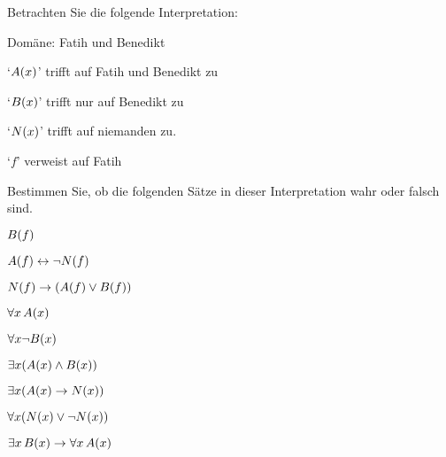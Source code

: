 \practiceproblems
\problempart
\label{pr.TorF1}
Betrachten Sie die folgende Interpretation:
	\begin{ebullet}
		\item Domäne: Fatih und Benedikt
		\item `$\mathord{A}(x)$' trifft auf Fatih und Benedikt zu
		\item `$\mathord{B}(x)$' trifft nur auf Benedikt zu
		\item `$\mathord{N}(x)$' trifft auf niemanden zu.
		\item `$f$' verweist auf Fatih
	\end{ebullet}
Bestimmen Sie, ob die folgenden Sätze in dieser Interpretation wahr oder falsch sind.
\begin{earg}
\item $\mathord{B}(f) $
\item $\mathord{A}(f)  \leftrightarrow \neg \mathord{N}(f)$
\item $\mathord{N}(f)  \rightarrow (\mathord{A}(f) \vee \mathord{B}(f))$
\item $\forall x\, \mathord{A}(x)$
\item $\forall x \neg \mathord{B}(x)$
\item $\exists x(\mathord{A}(x) \wedge \mathord{B}(x))$
\item $\exists x(\mathord{A}(x) \rightarrow \mathord{N}(x))$
\item $\forall x(\mathord{N}(x) \vee \neg \mathord{N}(x))$
\item $\exists x\, \mathord{B}(x) \rightarrow \forall x\, \mathord{A}(x)$
\end{earg}


